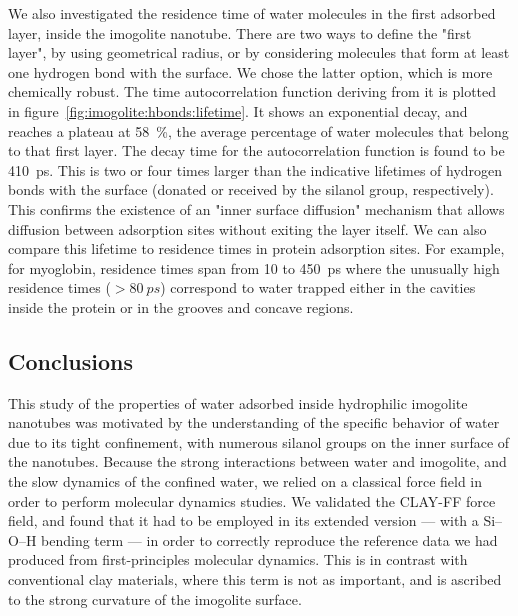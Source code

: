\documentclass[thesis]{subfiles}
\begin{document}
We also investigated the residence time of water molecules in the first adsorbed
layer, inside the imogolite nanotube. There are two ways to define the "first
layer", by using geometrical radius, or by considering molecules that form at
least one hydrogen bond with the surface. We chose the latter option, which is
more chemically robust. The time autocorrelation function deriving from it is
plotted in figure~\ref{fig:imogolite:hbonds:lifetime}. It shows an exponential
decay, and reaches a plateau at 58~\%, \ie the average percentage of water
molecules that belong to that first layer. The decay time for the
autocorrelation function is found to be \SI{410}{ps}. This is two or four times
larger than the indicative lifetimes of hydrogen bonds with the surface (donated
or received by the silanol group, respectively). This confirms the existence of
an "inner surface diffusion" mechanism that allows diffusion between adsorption
sites without exiting the layer itself. We can also compare this lifetime to
residence times in protein adsorption sites. For example, for
myoglobin\cite{Makarov2000}, residence times span from 10 to \SI{450}{ps} where
the unusually high residence times ($> \SI{80}{ps}$) correspond to water trapped
either in the cavities inside the protein or in the grooves and concave regions.

\subsection*{Conclusions}

This study of the properties of water adsorbed inside hydrophilic imogolite
nanotubes was motivated by the understanding of the specific behavior of water
due to its tight confinement, with numerous silanol groups on the inner surface
of the nanotubes. Because the strong interactions between water and imogolite,
and the slow dynamics of the confined water, we relied on a classical force
field in order to perform molecular dynamics studies. We validated the CLAY-FF
force field, and found that it had to be employed in its extended version ---
with a Si--O--H bending term --- in order to correctly reproduce the reference
data we had produced from first-principles molecular dynamics. This is in
contrast with conventional clay materials, where this term is not as important,
and is ascribed to the strong curvature of the imogolite surface.
\end{document}
